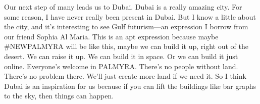 Our next step of many leads us to Dubai. Dubai is a really amazing city.
For some reason, I have never really been present in Dubai. But I know a
little about the city, and it's interesting to see Gulf futurism---an
expression I borrow from our friend Sophia Al Maria. This is an apt
expression because maybe \#NEWPALMYRA will be like this, maybe we can
build it up, right out of the desert. We can raise it up. We can build
it in space. Or we can build it just online. Everyone's welcome in
PALMYRA. There's no people without land. There's no problem there. We'll
just create more land if we need it. So I think Dubai is an inspiration
for us because if you can lift the buildings like bar graphs to the sky,
then things can happen.
